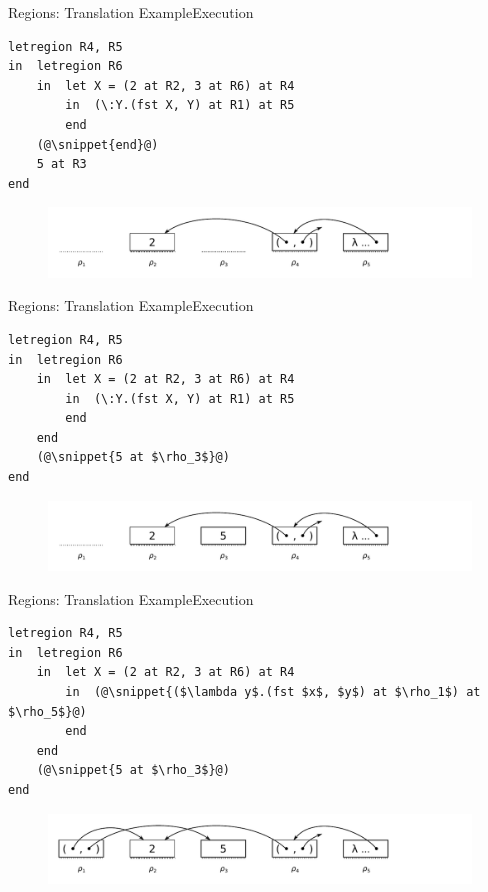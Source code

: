 \documentclass[xcolor=x11names,compress]{beamer}
\newcommand{\snippet}[1] {\textcolor{code}{\texttt{#1}}}
\renewcommand{\(}{\begin{columns}}
\renewcommand{\)}{\end{columns}}
\newcommand{\<}[1]{\begin{column}{#1}}
\renewcommand{\>}{\end{column}}
\begin{document}
\begin{frame}[fragile]{Regions: Translation Example}{Execution}
\begin{lstlisting}
letregion R4, R5
in  letregion R6
    in  let X = (2 at R2, 3 at R6) at R4
        in  (\:Y.(fst X, Y) at R1) at R5
        end
    (@\snippet{end}@)
    5 at R3
end
\end{lstlisting}

\begin{figure}[h]
    \includegraphics[width=\textwidth]{regions-5}
\end{figure}
\end{frame}

\begin{frame}[fragile]{Regions: Translation Example}{Execution}
\begin{lstlisting}
letregion R4, R5
in  letregion R6
    in  let X = (2 at R2, 3 at R6) at R4
        in  (\:Y.(fst X, Y) at R1) at R5
        end
    end
    (@\snippet{5 at $\rho_3$}@)
end
\end{lstlisting}

\begin{figure}[h]
    \includegraphics[width=\textwidth]{regions-6}
\end{figure}
\end{frame}

\begin{frame}[fragile]{Regions: Translation Example}{Execution}
\begin{lstlisting}
letregion R4, R5
in  letregion R6
    in  let X = (2 at R2, 3 at R6) at R4
        in  (@\snippet{($\lambda y$.(fst $x$, $y$) at $\rho_1$) at $\rho_5$}@)
        end
    end
    (@\snippet{5 at $\rho_3$}@)
end
\end{lstlisting}

\begin{figure}[h]
    \includegraphics[width=\textwidth]{regions-7}
\end{figure}
\end{frame}
\end{document}
